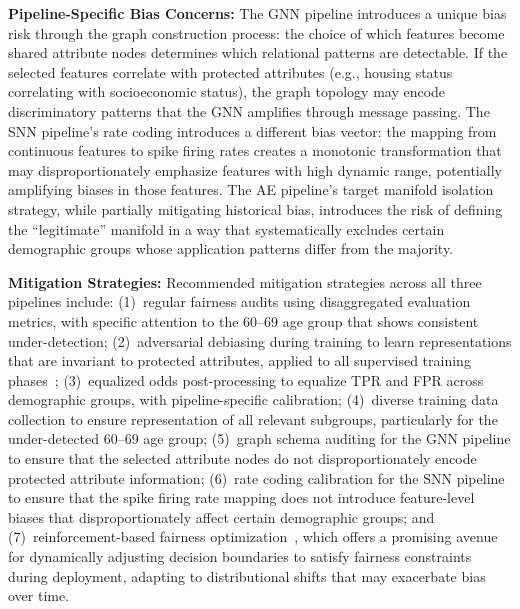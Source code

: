 \textbf{Pipeline-Specific Bias Concerns:} The GNN pipeline introduces a unique bias risk through the graph construction process: the choice of which features become shared attribute nodes determines which relational patterns are detectable. If the selected features correlate with protected attributes (e.g., housing status correlating with socioeconomic status), the graph topology may encode discriminatory patterns that the GNN amplifies through message passing. The SNN pipeline's rate coding introduces a different bias vector: the mapping from continuous features to spike firing rates creates a monotonic transformation that may disproportionately emphasize features with high dynamic range, potentially amplifying biases in those features. The AE pipeline's target manifold isolation strategy, while partially mitigating historical bias, introduces the risk of defining the ``legitimate'' manifold in a way that systematically excludes certain demographic groups whose application patterns differ from the majority.

\textbf{Mitigation Strategies:} Recommended mitigation strategies across all three pipelines include: (1)~regular fairness audits using disaggregated evaluation metrics, with specific attention to the 60--69 age group that shows consistent under-detection; (2)~adversarial debiasing during training to learn representations that are invariant to protected attributes, applied to all supervised training phases~\cite{kozodoi2022fairness}; (3)~equalized odds post-processing to equalize TPR and FPR across demographic groups, with pipeline-specific calibration; (4)~diverse training data collection to ensure representation of all relevant subgroups, particularly for the under-detected 60--69 age group; (5)~graph schema auditing for the GNN pipeline to ensure that the selected attribute nodes do not disproportionately encode protected attribute information; (6)~rate coding calibration for the SNN pipeline to ensure that the spike firing rate mapping does not introduce feature-level biases that disproportionately affect certain demographic groups; and (7)~reinforcement-based fairness optimization~\cite{nasif2026reinforcement}, which offers a promising avenue for dynamically adjusting decision boundaries to satisfy fairness constraints during deployment, adapting to distributional shifts that may exacerbate bias over time.
